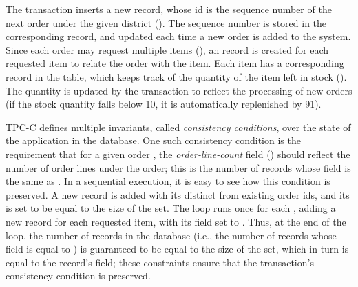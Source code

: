 The  transaction inserts a new  record, whose
id is the sequence number of the next order under the given district
(). The sequence number is stored in the corresponding
 record, and updated each time a new order is added to the
system. Since each order may request multiple items (),
an  record is created for each requested item to relate
the order with the item. Each item has a corresponding record in the
 table, which keeps track of the quantity of the item left in
stock (). The quantity is updated by the transaction to
reflect the processing of new orders (if the stock quantity falls below
10, it is automatically replenished by 91).

TPC-C defines multiple invariants, called \emph{consistency
  conditions}, over the state of the application in the database. One
such consistency condition is the requirement that for a given order
, the \emph{order-line-count} field () should
reflect the number of order lines under the order; this is the number
of  records whose  field is the same as
.  In a sequential execution, it is easy to see how this
condition is preserved.  A new  record is added with its
 distinct from existing order ids, and its  is
set to be equal to the size of the  set. The 
loop runs once for each , adding a new 
record for each requested item, with its  field set to
. Thus, at the end of the loop, the number of 
records in the database (i.e., the number of records whose
 field is equal to ) is guaranteed to be equal
to the size of the  set, which in turn is equal to the
 record's  field; these constraints ensure that
the transaction's consistency condition is preserved.

